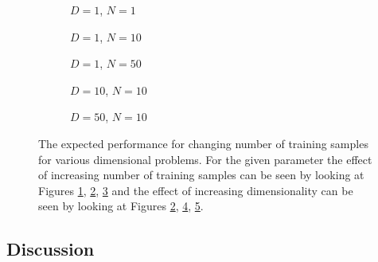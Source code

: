 \begin{figure}[!h]
  \centering
    \begin{subfigure}{0.33\textwidth}
      \centering
      \caption{$D=1$, $N=1$}
      \label{fig:nonlinear-c2-N-1-D-1}
    \end{subfigure}
    \begin{subfigure}{0.33\textwidth}
      \centering
      \caption{$D=1$, $N=10$}
      \label{fig:nonlinear-c2-N-10-D-1}
    \end{subfigure}
    \begin{subfigure}{0.33\textwidth}
      \centering
      \caption{$D=1$, $N=50$}
      \label{fig:nonlinear-c2-N-50-D-1}
    \end{subfigure}

    \begin{subfigure}{0.33\textwidth}
      \centering
      \caption{$D=10$, $N=10$}
      \label{fig:nonlinear-c2-N-10-D-10}
    \end{subfigure}
    \begin{subfigure}{0.33\textwidth}
      \centering
      \caption{$D=50$, $N=10$}
      \label{fig:nonlinear-c2-N-10-D-50}
    \end{subfigure}  

  \caption{The expected performance for changing number of training samples for various dimensional problems. For the given parameter the effect of increasing number of training samples can be seen by looking at Figures \ref{fig:nonlinear-c2-N-1-D-1}, \ref{fig:nonlinear-c2-N-10-D-1}, \ref{fig:nonlinear-c2-N-50-D-1} and the effect of increasing dimensionality can be seen by looking at Figures \ref{fig:nonlinear-c2-N-10-D-1}, \ref{fig:nonlinear-c2-N-10-D-10}, \ref{fig:nonlinear-c2-N-10-D-50}.}\label{fig:nonlinear-c2}
\end{figure}

\subsection{Discussion}

